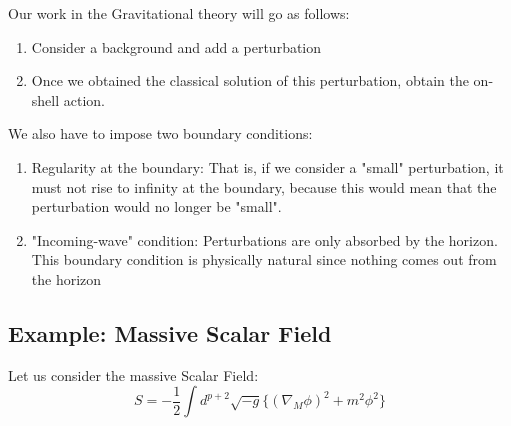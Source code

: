 \documentclass[12pt]{article}
\begin{document}
\vspace{0.25cm}

Our work in the Gravitational theory will go as follows:
\begin{enumerate}
    \item Consider a background and add a perturbation
    \item Once we obtained the classical solution of this perturbation, obtain the on-shell action.
\end{enumerate}

We also have to impose two boundary conditions:
\begin{enumerate}
    \item Regularity at the boundary: That is, if we consider a "small" perturbation, it must not rise to infinity at the boundary, because this would mean that the perturbation would no longer be "small".

    \item "Incoming-wave" condition: Perturbations are only absorbed by the horizon. This boundary condition is physically natural since nothing comes out from the horizon
\end{enumerate}

\subsection{Example: Massive Scalar Field}

Let us consider the massive Scalar Field:
\[
    S=-\frac{1}{2}\int d^{p+2}\sqrt{-g}\{(\nabla_M\phi)^2+m^2\phi^2\}
\]
\end{document}
